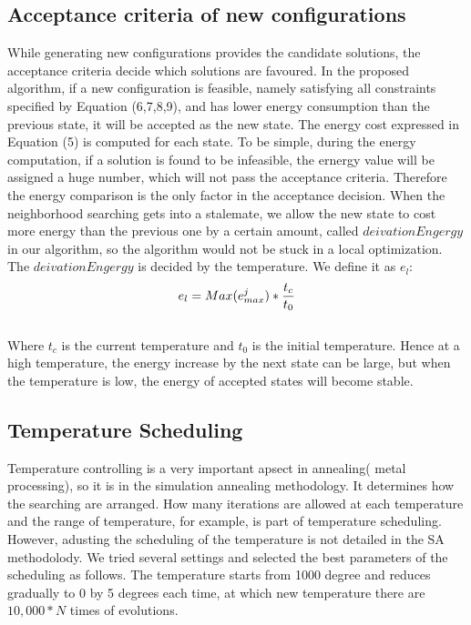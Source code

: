 \documentclass[10pt, conference, compsocconf]{IEEEtran}
\begin{document}
\subsection{ Acceptance criteria of new configurations}
While generating new configurations provides the candidate solutions, the
acceptance criteria decide which solutions are favoured. In the proposed
algorithm, if a new configuration is feasible, namely satisfying all constraints
specified by Equation (6,7,8,9), and has lower energy consumption than the
previous state, it will be accepted as the new state.
The energy cost expressed in Equation (5) is computed for each state. To be
simple, during the energy computation, if a solution is found to be infeasible,
the ernergy value will be assigned a huge number, which will not pass the
acceptance criteria. Therefore the energy comparison is the only factor in the
acceptance decision. When the neighborhood searching gets into a stalemate, we
allow the new state to cost more energy than the previous one by a certain
amount, called $deivationEngergy$ in our algorithm, so the algorithm would not
be stuck in a local optimization.
The $deivationEngergy$ is decided by the temperature. We define it as $e_l$:\\
\begin{equation}\label{11}
e_l=Max(e_{max}^j)*\frac{t_c}{t_0} \\
\end{equation}\\
Where $t_c$ is the current temperature and $t_0$ is the initial temperature.
Hence at a high temperature, the energy increase by the next state can be large,
but when the temperature is low, the energy of accepted states will become
stable.

\subsection{ Temperature Scheduling}
Temperature controlling is a very important apsect in annealing( metal
processing), so it is in the simulation annealing methodology. It determines how
the searching are arranged. How many iterations are allowed at each temperature
and the range of temperature, for example, is part of temperature scheduling.
However, adusting the scheduling of the temperature is not detailed in the SA
methodolody. We tried several settings and selected the best parameters of
the scheduling as follows. The temperature starts from 1000 degree and reduces
gradually to 0 by 5 degrees each time, at which new temperature there are $10,000*N$ times
of evolutions.
\end{document}
